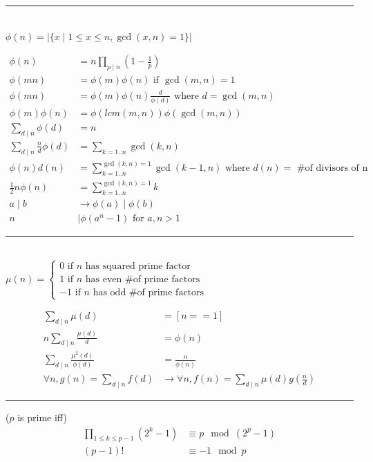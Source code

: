 \documentclass[10pt,letterpaper,landscape]{article}
\begin{document}
\begin{multicols}{2}
\noindent\rule{\linewidth}{1pt}

 \\ $\phi(n) = |\{x \mid 1 \le x \le n, \gcd(x,n) = 1\}|$

\begin{align*}
	\phi(n) &= n \prod_{p \mid n}{(1 - \frac{1}{p})} \\
	\phi(mn) &= \phi(m) \phi(n) \text{ if } \gcd(m, n) = 1 \\
	\phi(mn) &= \phi(m) \phi(n) \frac{d}{\phi(d)} \text{ where } d = \gcd(m, n) \\
	\phi(m) \phi(n) &= \phi(lcm(m,n)) \phi(\gcd(m,n)) \\
	\sum_{d \mid n}{\phi(d)} &= n \\
	\sum_{d \mid n}{\frac{n}{d} \phi(d)} &= \sum_{k=1..n}{\gcd(k, n)} \\
	\phi(n) d(n) &= \sum_{k=1..n}^{\gcd(k,n)=1}{\gcd(k-1, n)} \text{ where } d(n) = \text{ \# of divisors of n }\\
	\frac{1}{2} n \phi(n) &= \sum_{k=1..n}^{\gcd(k,n)=1}{k} \\
	a \mid b &\rightarrow \phi(a) \mid \phi(b) \\
	n &\mid \phi(a^n - 1) \text{ for } a,n > 1
\end{align*}

\noindent\rule{\linewidth}{1pt}

 \\ $\mu(n) = \begin{cases} 0 \text{ if $n$ has squared prime factor} \\ 1 \text{ if $n$ has even \# of prime factors} \\ -1 \text{ if $n$ has odd \# of prime factors} \end{cases}$

\begin{align*}
	\sum_{d \mid n}{\mu(d)} &= [n==1] \\
	n \sum_{d \mid n}{\frac{\mu(d)}{d}} &= \phi(n) \\
	\sum_{d \mid n}{\frac{\mu^2(d)}{\phi(d)}} &= \frac{n}{\phi(n)} \\
	\forall n, g(n) = \sum_{d \mid n}{f(d)} &\rightarrow \forall n, f(n) = \sum_{d \mid n}{\mu(d) g(\frac{n}{d})} %
\end{align*}

\noindent\rule{\linewidth}{1pt}

 ($p$ is prime iff)
\begin{align*}
	\prod_{1 \le k \le p-1}{(2^k - 1)} &\equiv p \mod{(2^p - 1)} \\ %
	(p-1)! &\equiv -1 \mod{p} %
\end{align*}


\end{multicols}
\end{document}

